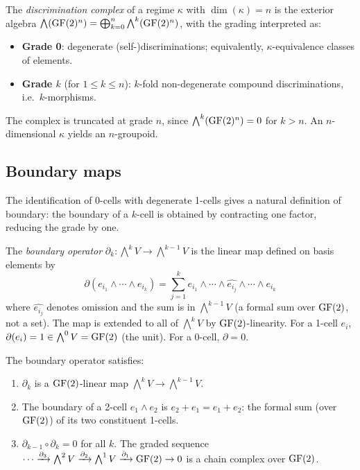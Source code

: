 \begin{definition}\label{def:complex}
The \emph{discrimination complex} of a regime $\kappa$ with
$\dim(\kappa) = n$ is the exterior algebra
$\bigwedge(\operatorname{GF}(2)^n) = \bigoplus_{k=0}^{n} \bigwedge^k(\operatorname{GF}(2)^n)$,
with the grading interpreted as:
\begin{itemize}[nosep]
  \item \textbf{Grade 0}: degenerate (self-)discriminations;
    equivalently, $\kappa$-equivalence classes of elements.
  \item \textbf{Grade $k$} (for $1 \leq k \leq n$):
    $k$-fold non-degenerate compound discriminations, i.e.\
    $k$-morphisms.
\end{itemize}
The complex is truncated at grade $n$, since
$\bigwedge^k(\operatorname{GF}(2)^n) = 0$ for $k > n$. An $n$-dimensional
$\kappa$ yields an $n$-groupoid.
\end{definition}

\subsection{Boundary maps}\label{sec:boundary}

The identification of 0-cells with degenerate 1-cells gives
a natural definition of boundary: the boundary of a $k$-cell
is obtained by contracting one factor, reducing the grade by
one.

\begin{definition}\label{def:boundary}
The \emph{boundary operator}
$\partial_k: \bigwedge^k V \to \bigwedge^{k-1} V$ is the
linear map defined on basis elements by
\begin{equation}\label{eq:boundary}
  \partial(e_{i_1} \wedge \cdots \wedge e_{i_k})
  = \sum_{j=1}^{k}
    e_{i_1} \wedge \cdots \wedge \widehat{e_{i_j}} \wedge
    \cdots \wedge e_{i_k}
\end{equation}
where $\widehat{e_{i_j}}$ denotes omission and the sum
is in $\bigwedge^{k-1} V$ (a formal sum over $\operatorname{GF}(2)$,
not a set). The map is extended to all of $\bigwedge^k V$
by $\operatorname{GF}(2)$-linearity. For a 1-cell $e_i$,
$\partial(e_i) = 1 \in \bigwedge^0 V = \operatorname{GF}(2)$ (the
unit). For a 0-cell, $\partial = 0$.
\end{definition}

\begin{proposition}[Chain complex]\label{prop:boundary}
The boundary operator satisfies:
\begin{enumerate}[label=(\roman*),nosep]
  \item $\partial_k$ is a $\operatorname{GF}(2)$-linear map
    $\bigwedge^k V \to \bigwedge^{k-1} V$.
  \item The boundary of a 2-cell $e_1 \wedge e_2$ is
    $e_2 + e_1 = e_1 + e_2$: the formal sum (over $\operatorname{GF}(2)$)
    of its two constituent 1-cells.
  \item $\partial_{k-1} \circ \partial_k = 0$ for all $k$.
    The graded sequence
    $\cdots \xrightarrow{\partial_3} \bigwedge^2 V
    \xrightarrow{\partial_2} \bigwedge^1 V
    \xrightarrow{\partial_1} \operatorname{GF}(2) \to 0$
    is a chain complex over $\operatorname{GF}(2)$.
\end{enumerate}
\end{proposition}

